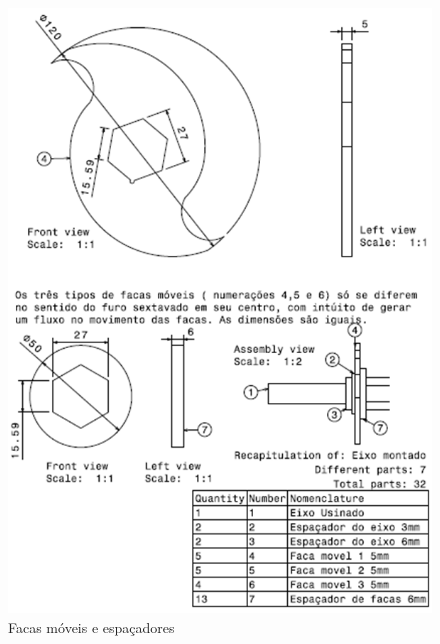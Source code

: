 \begin{anexosenv}
\begin{figure}[!ht]
	\centering
		\includegraphics[scale=0.6]{figuras/estrutura/anexos/3.png}
	\caption{Facas móveis e espaçadores}
\end{figure}


\end{anexosenv}
